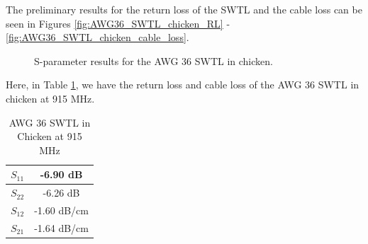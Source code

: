 \documentclass[12pt,onecolumn,titlepage]{article}
\begin{document}
The preliminary results for the return loss of the SWTL and the cable loss can be seen in Figures \ref{fig:AWG36_SWTL_chicken_RL} - \ref{fig:AWG36_SWTL_chicken_cable_loss}.



\begin{figure}[htbp]
	\centering
		\quad
	\label{fig:SWTL_chicken_AWG36_Sparam}
	\caption{S-parameter results for the AWG 36 SWTL in chicken. }
\end{figure}




Here, in Table \ref{tab:AWG36_SWTL_chicken}, we have the return loss and cable loss of the AWG 36 SWTL in chicken at 915 MHz. 



\begin{table}[h!]
\centering
	\caption{AWG 36 SWTL in Chicken at 915 MHz}
	\vspace{10pt}
	\begin{tabular}{| c | c |}
	\hline
	$S_{11}$ & -6.90 dB \\ \hline
	$S_{22}$ & -6.26 dB \\ \hline
	$S_{12}$ & -1.60 dB/cm \\ \hline
	$S_{21}$ & -1.64 dB/cm \\ \hline
	\end{tabular}
\label{tab:AWG36_SWTL_chicken}
\end{table}
\end{document}
